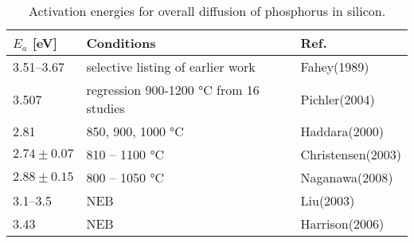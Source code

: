 \documentclass[11pt,bibliography=totoc,index=totoc]{scrbook}   %
\begin{document}
\begin{table}[htbp]
  \centering
  \begin{threeparttable}[htbp]
      \begin{tabular}{lp{7cm}l}
      \toprule
        $E_a$ [eV]      & Conditions                                            & Ref. \\
      \midrule
        3.51–3.67       & selective listing of earlier work                     & Fahey(1989)\cite[320]{Fahey:1989} \\
        3.507           & regression 900-1200 \si{\celsius} from 16 studies     & Pichler(2004)\cite[395]{Pichler:2004} \\
      \midrule
        2.81            & 850, 900, 1000 \si{\celsius}                          & Haddara(2000)\cite{Haddara:2000} \\
        $2.74\pm 0.07$  & 810 -- 1100 \si{\celsius}                             & Christensen(2003)\cite{Christensen:2003} \\
        $2.88\pm 0.15$  & 800 -- 1050 \si{\celsius}                             & Naganawa(2008)\cite{Naganawa:2008} \\
      \midrule
        3.1--3.5        & NEB                                                   & Liu(2003)\cite{Liu:2003} \\
        3.43            & NEB                                                   & Harrison(2006)\cite{Harrison:2006} \\
      \bottomrule
    \end{tabular}
  \end{threeparttable}
  \caption{Activation energies for overall diffusion of phosphorus in silicon.}
  \label{tab:diffusivities}
\end{table}
\end{document}
